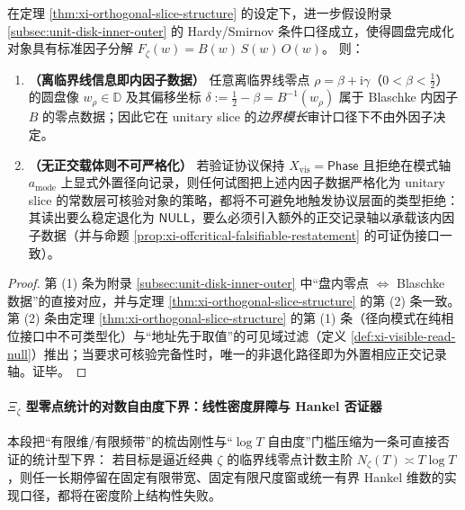 \begin{corollary}[内因子数据的正交寄存器必要性]\label{cor:xi-inner-factor-orthogonal-register}
在定理 \ref{thm:xi-orthogonal-slice-structure} 的设定下，进一步假设附录 \ref{subsec:unit-disk-inner-outer} 的 Hardy/Smirnov 条件口径成立，使得圆盘完成化对象具有标准因子分解
\(
F_\zeta(w)=B(w)\,S(w)\,O(w)
\)。
则：
\begin{enumerate}
  \item \textbf{（离临界线信息即内因子数据）}
  任意离临界线零点 \(\rho=\beta+\mathrm{i}\gamma\)（\(0<\beta<\tfrac12\)）的圆盘像 \(w_\rho\in\mathbb{D}\) 及其偏移坐标
  \(
  \delta:=\tfrac12-\beta=B^{-1}(w_\rho)
  \)
  属于 Blaschke 内因子 \(B\) 的零点数据；因此它在 unitary slice 的\emph{边界模长}审计口径下不由外因子决定。
  \item \textbf{（无正交载体则不可严格化）}
  若验证协议保持 \(X_{\mathrm{vis}}=\mathsf{Phase}\) 且拒绝在模式轴 \(a_{\mathrm{mode}}\) 上显式外置径向记录，则任何试图把上述内因子数据严格化为 unitary slice 的常数层可核验对象的策略，都将不可避免地触发协议层面的类型拒绝：其读出要么稳定退化为 \(\mathsf{NULL}\)，要么必须引入额外的正交记录轴以承载该内因子数据（并与命题 \ref{prop:xi-offcritical-falsifiable-restatement} 的可证伪接口一致）。
\end{enumerate}
\end{corollary}

\begin{proof}
第 (1) 条为附录 \ref{subsec:unit-disk-inner-outer} 中“盘内零点 \(\Leftrightarrow\) Blaschke 数据”的直接对应，并与定理 \ref{thm:xi-orthogonal-slice-structure} 的第 (2) 条一致。
第 (2) 条由定理 \ref{thm:xi-orthogonal-slice-structure} 的第 (1) 条（径向模式在纯相位接口中不可类型化）与“地址先于取值”的可见域过滤（定义 \ref{def:xi-visible-read-null}）推出；当要求可核验完备性时，唯一的非退化路径即为外置相应正交记录轴。证毕。
\end{proof}

\paragraph{\texorpdfstring{$\Xi_\zeta$}{Xi-zeta} 型零点统计的对数自由度下界：线性密度屏障与 Hankel 否证器}
本段把“有限维/有限频带”的梳齿刚性与“\(\log T\) 自由度”门槛压缩为一条可直接否证的统计型下界：
若目标是逼近经典 \(\zeta\) 的临界线零点计数主阶 \(N_\zeta(T)\asymp T\log T\)，则任一长期停留在固定有限带宽、固定有限尺度窗或统一有界 Hankel 维数的实现口径，都将在密度阶上结构性失败。

